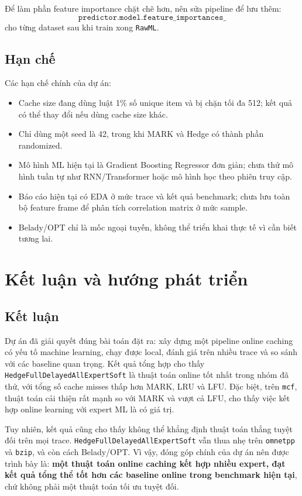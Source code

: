 \documentclass[11pt,a4paper]{article}
\newcommand{\code}[1]{\texttt{#1}}
\newcommand{\hedge}{\code{HedgeFullDelayedAllExpertSoft}}
\newcommand{\rawml}{\code{RawML}}
\begin{document}
Để làm phần feature importance chặt chẽ hơn, nên sửa pipeline để lưu thêm:
\[
    \code{predictor.model.feature\_importances\_}
\]
cho từng dataset sau khi train xong \rawml{}.

\subsection{Hạn chế}

Các hạn chế chính của dự án:

\begin{itemize}[leftmargin=1.4em]
    \item Cache size đang dùng luật 1\% số unique item và bị chặn tối đa 512; kết quả có thể thay đổi nếu dùng cache size khác.
    \item Chỉ dùng một seed là 42, trong khi MARK và Hedge có thành phần randomized.
    \item Mô hình ML hiện tại là Gradient Boosting Regressor đơn giản; chưa thử mô hình tuần tự như RNN/Transformer hoặc mô hình học theo phiên truy cập.
    \item Báo cáo hiện tại có EDA ở mức trace và kết quả benchmark; chưa lưu toàn bộ feature frame để phân tích correlation matrix ở mức sample.
    \item Belady/OPT chỉ là mốc ngoại tuyến, không thể triển khai thực tế vì cần biết tương lai.
\end{itemize}

\section{Kết luận và hướng phát triển}

\subsection{Kết luận}

Dự án đã giải quyết đúng bài toán đặt ra: xây dựng một pipeline online caching có yếu tố machine learning, chạy được local, đánh giá trên nhiều trace và so sánh với các baseline quan trọng. Kết quả tổng hợp cho thấy \hedge{} là thuật toán online tốt nhất trong nhóm đã thử, với tổng số cache misses thấp hơn MARK, LRU và LFU. Đặc biệt, trên \code{mcf}, thuật toán cải thiện rất mạnh so với MARK và vượt cả LFU, cho thấy việc kết hợp online learning với expert ML là có giá trị.

Tuy nhiên, kết quả cũng cho thấy không thể khẳng định thuật toán thắng tuyệt đối trên mọi trace. \hedge{} vẫn thua nhẹ trên \code{omnetpp} và \code{bzip}, và còn cách Belady/OPT. Vì vậy, đóng góp chính của dự án nên được trình bày là: \textbf{một thuật toán online caching kết hợp nhiều expert, đạt kết quả tổng thể tốt hơn các baseline online trong benchmark hiện tại}, chứ không phải một thuật toán tối ưu tuyệt đối.
\end{document}
